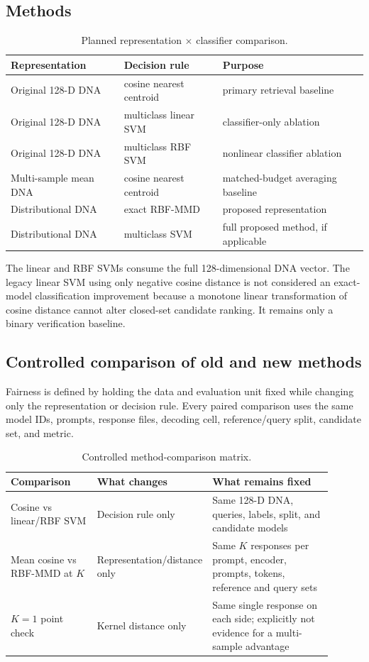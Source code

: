 \documentclass[11pt,a4paper]{article}
\begin{document}
\subsection{Methods}

\begin{table}[ht]
\centering
\caption{Planned representation $\times$ classifier comparison.}
\label{tab:method-matrix}
\begin{tabular}{lll}
\toprule
Representation & Decision rule & Purpose \\
\midrule
Original 128-D DNA & cosine nearest centroid & primary retrieval baseline \\
Original 128-D DNA & multiclass linear SVM & classifier-only ablation \\
Original 128-D DNA & multiclass RBF SVM & nonlinear classifier ablation \\
Multi-sample mean DNA & cosine nearest centroid & matched-budget averaging baseline \\
Distributional DNA & exact RBF-MMD & proposed representation \\
Distributional DNA & multiclass SVM & full proposed method, if applicable \\
\bottomrule
\end{tabular}
\end{table}

The linear and RBF SVMs consume the full 128-dimensional DNA vector. The legacy
linear SVM using only negative cosine distance is not considered an exact-model
classification improvement because a monotone linear transformation of cosine
distance cannot alter closed-set candidate ranking. It remains only a binary
verification baseline.

\subsection{Controlled comparison of old and new methods}

Fairness is defined by holding the data and evaluation unit fixed while changing
only the representation or decision rule. Every paired comparison uses the
same model IDs, prompts, response files, decoding cell, reference/query split,
candidate set, and metric.

\begin{table}[htbp]
\centering
\small
\caption{Controlled method-comparison matrix.}
\label{tab:controlled-method-comparison}
\begin{tabular}{p{0.28\linewidth}p{0.20\linewidth}p{0.42\linewidth}}
\toprule
Comparison & What changes & What remains fixed \\
\midrule
Cosine vs linear/RBF SVM & Decision rule only & Same 128-D DNA, queries,
labels, split, and candidate models \\
Mean cosine vs RBF-MMD at $K$ & Representation/distance only & Same $K$
responses per prompt, encoder, prompts, tokens, reference and query sets \\
$K=1$ point check & Kernel distance only & Same single response on each side;
explicitly not evidence for a multi-sample advantage \\
\bottomrule
\end{tabular}
\end{table}
\end{document}

